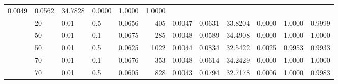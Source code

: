 \begin{table}[H]
{\begin{tabular}{llllrrrrrrrr}
{\cellcolor[HTML]{0000FF}} \color[HTML]{F1F1F1} 0.0049 & {\cellcolor[HTML]{F0F0F3}} \color[HTML]{000000} 0.0562 & {\cellcolor[HTML]{0000FF}} \color[HTML]{F1F1F1} 34.7828 & {\cellcolor[HTML]{F0F0F3}} \color[HTML]{000000} 0.0000 & {\cellcolor[HTML]{0000FF}} \color[HTML]{F1F1F1} 1.0000 & {\cellcolor[HTML]{0000FF}} \color[HTML]{F1F1F1} 1.0000 \\ & 20 & 0.01 & 0.5 & {\cellcolor[HTML]{3838FC}} \color[HTML]{F1F1F1} 0.0656 & {\cellcolor[HTML]{D0D0F4}} \color[HTML]{000000} 405 & {\cellcolor[HTML]{3535FC}} \color[HTML]{F1F1F1} 0.0047 & {\cellcolor[HTML]{E8E8F3}} \color[HTML]{000000} 0.0631 & {\cellcolor[HTML]{2323FD}} \color[HTML]{F1F1F1} 33.8204 & {\cellcolor[HTML]{F0F0F3}} \color[HTML]{000000} 0.0000 & {\cellcolor[HTML]{0000FF}} \color[HTML]{F1F1F1} 1.0000 & {\cellcolor[HTML]{0000FF}} \color[HTML]{F1F1F1} 0.9999 \\ & 50 & 0.01 & 0.1 & {\cellcolor[HTML]{1414FE}} \color[HTML]{F1F1F1} 0.0675 & {\cellcolor[HTML]{E2E2F3}} \color[HTML]{000000} 285 & {\cellcolor[HTML]{1A1AFE}} \color[HTML]{F1F1F1} 0.0048 & {\cellcolor[HTML]{EEEEF3}} \color[HTML]{000000} 0.0589 & {\cellcolor[HTML]{0A0AFE}} \color[HTML]{F1F1F1} 34.4908 & {\cellcolor[HTML]{F0F0F3}} \color[HTML]{000000} 0.0000 & {\cellcolor[HTML]{0000FF}} \color[HTML]{F1F1F1} 1.0000 & {\cellcolor[HTML]{0000FF}} \color[HTML]{F1F1F1} 1.0000 \\ & 50 & 0.01 & 0.5 & {\cellcolor[HTML]{7272F9}} \color[HTML]{F1F1F1} 0.0625 & {\cellcolor[HTML]{7676F9}} \color[HTML]{F1F1F1} 1022 & {\cellcolor[HTML]{8686F8}} \color[HTML]{F1F1F1} 0.0044 & {\cellcolor[HTML]{CDCDF5}} \color[HTML]{000000} 0.0834 & {\cellcolor[HTML]{5151FB}} \color[HTML]{F1F1F1} 32.5422 & {\cellcolor[HTML]{E7E7F3}} \color[HTML]{000000} 0.0025 & {\cellcolor[HTML]{1313FE}} \color[HTML]{F1F1F1} 0.9953 & {\cellcolor[HTML]{0909FF}} \color[HTML]{F1F1F1} 0.9933 \\ & 70 & 0.01 & 0.1 & {\cellcolor[HTML]{1313FE}} \color[HTML]{F1F1F1} 0.0676 & {\cellcolor[HTML]{D8D8F4}} \color[HTML]{000000} 353 & {\cellcolor[HTML]{1A1AFE}} \color[HTML]{F1F1F1} 0.0048 & {\cellcolor[HTML]{EAEAF3}} \color[HTML]{000000} 0.0614 & {\cellcolor[HTML]{1313FE}} \color[HTML]{F1F1F1} 34.2429 & {\cellcolor[HTML]{F0F0F3}} \color[HTML]{000000} 0.0000 & {\cellcolor[HTML]{0000FF}} \color[HTML]{F1F1F1} 1.0000 & {\cellcolor[HTML]{0000FF}} \color[HTML]{F1F1F1} 1.0000 \\ & 70 & 0.01 & 0.5 & {\cellcolor[HTML]{9999F7}} \color[HTML]{F1F1F1} 0.0605 & {\cellcolor[HTML]{9292F8}} \color[HTML]{F1F1F1} 828 & {\cellcolor[HTML]{A0A0F7}} \color[HTML]{F1F1F1} 0.0043 & {\cellcolor[HTML]{D1D1F4}} \color[HTML]{000000} 0.0794 & {\cellcolor[HTML]{4B4BFB}} \color[HTML]{F1F1F1} 32.7178 & {\cellcolor[HTML]{EFEFF3}} \color[HTML]{000000} 0.0006 & {\cellcolor[HTML]{0000FF}} \color[HTML]{F1F1F1} 1.0000 & {\cellcolor[HTML]{0202FF}} \color[HTML]{F1F1F1} 0.9983 \\
 	 \bottomrule[2.5pt] \end{tabular}
}
\end{table}
